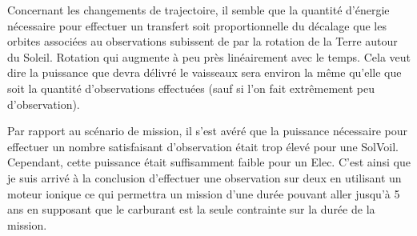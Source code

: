 \documentclass[12pt]{article} %
\begin{document}
		Concernant les changements de trajectoire, il semble que la quantité d'énergie nécessaire pour effectuer un transfert soit proportionnelle du décalage que les orbites associées au observations subissent de par la rotation de la Terre autour du Soleil. Rotation qui augmente à peu près linéairement avec le temps. Cela veut dire la puissance que devra délivré le vaisseaux sera environ la même qu'elle que soit la quantité d'observations effectuées (sauf si l'on fait extrêmement peu d'observation).
		
		Par rapport au scénario de mission, il s'est avéré que la puissance nécessaire pour effectuer un nombre satisfaisant d'observation était trop élevé pour une \gls{SolVoil}. Cependant, cette puissance était suffisamment faible pour un \gls{Elec}. C'est ainsi que je suis arrivé à la conclusion d'effectuer une observation sur deux en utilisant un moteur ionique ce qui permettra un mission d'une durée pouvant aller jusqu'à 5 ans en supposant que le carburant est la seule contrainte sur la durée de la mission.
		
		
		
\end{document}
